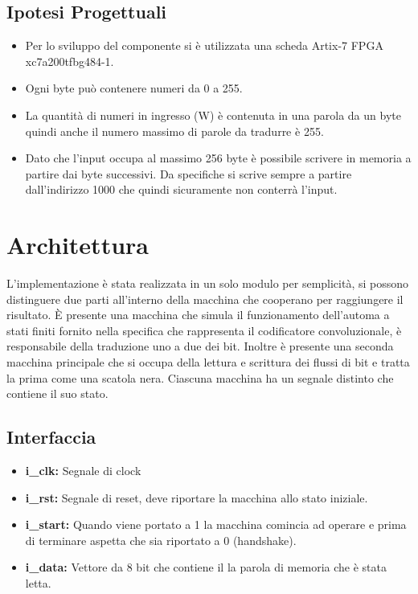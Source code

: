 \documentclass{article}
\begin{document}
\subsection{Ipotesi Progettuali}
\begin{itemize}
\item {Per lo sviluppo del componente si è utilizzata una scheda Artix-7 FPGA xc7a200tfbg484-1.}
\item {Ogni byte può contenere numeri da 0 a 255.}
\item {La quantità di numeri in ingresso (W) è contenuta in una parola da un byte quindi anche il numero massimo di parole da tradurre è 255.}
\item {Dato che l'input occupa al massimo 256 byte è possibile scrivere in memoria a partire dai byte successivi. Da specifiche si scrive sempre a partire dall'indirizzo 1000 che quindi sicuramente non conterrà l'input.}
\end{itemize}




\section{Architettura}
L'implementazione è stata realizzata in un solo modulo per semplicità, si possono distinguere due parti all'interno della macchina che cooperano per raggiungere il risultato. È presente una macchina che simula il funzionamento dell'automa a stati finiti fornito nella specifica che rappresenta il codificatore convoluzionale, è responsabile della traduzione uno a due dei bit. Inoltre è presente una seconda macchina principale che si occupa della lettura e scrittura dei flussi di bit e tratta la prima come una scatola nera. Ciascuna macchina ha un segnale distinto che contiene il suo stato.

\subsection{Interfaccia}
\begin{itemize}
	\item \textbf{i\_clk:} Segnale di clock
	\item \textbf{i\_rst:} Segnale di reset, deve riportare la macchina allo stato iniziale.
	\item \textbf{i\_start:} Quando viene portato a 1 la macchina comincia ad operare e prima di terminare aspetta che sia riportato a 0 (handshake).
	\item \textbf{i\_data:} Vettore da 8 bit che contiene il la parola di memoria che è stata letta.
\end{itemize}
\end{document}

